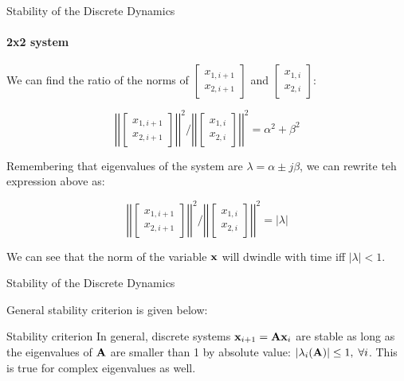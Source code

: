 \documentclass{beamer}
\begin{document}
\begin{frame}{Stability of the Discrete Dynamics}
	\framesubtitle{2x2 system}
	\begin{flushleft}
		
		We can find the ratio of the norms of $\begin{bmatrix}
			x_{1, i+1} \\ x_{2, i+1}
		\end{bmatrix}$ and $\begin{bmatrix}
			x_{1, i} \\ x_{2, i}
		\end{bmatrix}$: 
		
		
		
		\begin{equation}
			\left | \left|
			\begin{bmatrix}
				x_{1, i+1} \\ x_{2, i+1}
			\end{bmatrix}
			\right | \right|^2 
			/ 
			\left | \left|
			\begin{bmatrix}
				x_{1, i} \\ x_{2, i}
			\end{bmatrix}
			\right | \right|^2
			= 
			\alpha^2 + \beta^2
		\end{equation}
		
		Remembering that eigenvalues of the system are $\lambda  = \alpha \pm j\beta$, we can rewrite teh expression above as:
		
		\begin{equation}
	\left | \left|
	\begin{bmatrix}
		x_{1, i+1} \\ x_{2, i+1}
	\end{bmatrix}
	\right | \right|^2 
	/ 
	\left | \left|
	\begin{bmatrix}
		x_{1, i} \\ x_{2, i}
	\end{bmatrix}
	\right | \right|^2
	= 
	| \lambda |
		\end{equation}		
		
		We can see that the norm of the variable $\mathbf{x}$ will dwindle with time iff $|\lambda| < 1$.
		
	\end{flushleft}
\end{frame}




\begin{frame}{Stability of the Discrete Dynamics}
\begin{flushleft}

General stability criterion is given below:

\bigskip

\begin{block}{Stability criterion}
In general, discrete systems $\mathbf{x}_{i+1} = \mathbf{A}\mathbf{x}_i$ are stable as long as the eigenvalues of $\mathbf{A}$ are smaller than 1 by absolute value: $|\lambda_i(\mathbf{A})| \leq 1, \; \forall i$. This is true for complex eigenvalues as well.
\end{block}


\end{flushleft}
\end{frame}
\end{document}

